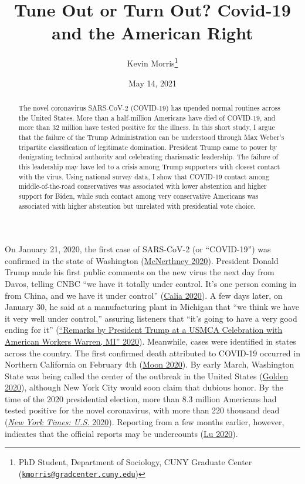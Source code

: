 \documentclass[
  12pt,
]{article}
\title{Tune Out or Turn Out? Covid-19 and the American Right}
\author{Kevin Morris\footnote{PhD Student, Department of Sociology, CUNY Graduate Center (\href{mailto:kmorris@gradcenter.cuny.edu}{\nolinkurl{kmorris@gradcenter.cuny.edu}})}}
\date{May 14, 2021}
\begin{document}
\maketitle
\begin{abstract}
The novel coronavirus SARS-CoV-2 (COVID-19) has upended normal routines across the United States. More than a half-million Americans have died of COVID-19, and more than 32 million have tested positive for the illness. In this short study, I argue that the failure of the Trump Administration can be understood through Max Weber's tripartite classification of legitimate domination. President Trump came to power by denigrating technical authority and celebrating charismatic leadership. The failure of this leadership may have led to a crisis among Trump supporters with closest contact with the virus. Using national survey data, I show that COVID-19 contact among middle-of-the-road conservatives was associated with lower abstention and higher support for Biden, while such contact among very conservative Americans was associated with higher abstention but unrelated with presidential vote choice.
\end{abstract}

\pagebreak

\doublespacing

On January 21, 2020, the first case of SARS-CoV-2 (or ``COVID-19'') was confirmed in the state of Washington (\protect\hyperlink{ref-McNerthney2020}{McNerthney 2020}). President Donald Trump made his first public comments on the new virus the next day from Davos, telling CNBC ``we have it totally under control. It's one person coming in from China, and we have it under control'' (\protect\hyperlink{ref-Calia2020}{Calia 2020}). A few days later, on January 30, he said at a manufacturing plant in Michigan that ``we think we have it very well under control,'' assuring listeners that ``it's going to have a very good ending for it'' (\protect\hyperlink{ref-whitehouse2020}{{``Remarks by {President Trump} at a {USMCA Celebration} with {American Workers} \textbar{} {Warren}, {MI}''} 2020}). Meanwhile, cases were identified in states across the country. The first confirmed death attributed to COVID-19 occurred in Northern California on February 4th (\protect\hyperlink{ref-Moon2020}{Moon 2020}). By early March, Washington State was being called the center of the outbreak in the United States (\protect\hyperlink{ref-Golden2020}{Golden 2020}), although New York City would soon claim that dubious honor. By the time of the 2020 presidential election, more than 8.3 million Americans had tested positive for the novel coronavirus, with more than 220 thousand dead (\protect\hyperlink{ref-nyt2020}{\emph{New York Times: U.S.} 2020}). Reporting from a few months earlier, however, indicates that the official reports may be undercounts (\protect\hyperlink{ref-Lu2020}{Lu 2020}).
\end{document}
